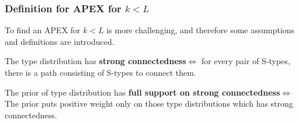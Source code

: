 \documentclass[9pt]{beamer}
\begin{document}
\begin{frame}
  \frametitle{Definition for APEX for $k<L$}

To find an APEX for $k<L$ is more challenging, and therefore some assumptions and definitions are introduced. 
\begin{definition}
The type distribution has \textbf{strong connectedness}$\Leftrightarrow$ for every pair of S-types, there is a path consisting of S-types to connect them.
\end{definition}  

\begin{definition}
The prior of type distribution has \textbf{full support on strong connectedness}$\Leftrightarrow$ 
The prior puts positive weight only on those type distributions which has strong connectedness.
\end{definition}  

%        
%
%    
%        
%

\end{frame}
\end{document}
